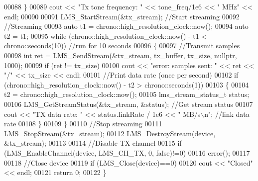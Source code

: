 \begin{DoxyCode}
00088     \}
00089     cout << \textcolor{stringliteral}{"Tx tone frequency: "} << tone\_freq/1e6 << \textcolor{stringliteral}{" MHz"} << endl;
00090 
00091     LMS_StartStream(&tx\_stream);         \textcolor{comment}{//Start streaming}
00092     \textcolor{comment}{//Streaming}
00093     \textcolor{keyword}{auto} t1 = chrono::high\_resolution\_clock::now();
00094     \textcolor{keyword}{auto} t2 = t1;
00095     \textcolor{keywordflow}{while} (chrono::high\_resolution\_clock::now() - t1 < chrono::seconds(10)) \textcolor{comment}{//run for 10 seconds}
00096     \{
00097         \textcolor{comment}{//Transmit samples}
00098         \textcolor{keywordtype}{int} ret = LMS_SendStream(&tx\_stream, tx\_buffer, tx\_size, \textcolor{keyword}{nullptr}, 1000);
00099         \textcolor{keywordflow}{if} (ret != tx\_size)
00100             cout << \textcolor{stringliteral}{"error: samples sent: "} << ret << \textcolor{stringliteral}{"/"} << tx\_size << endl;
00101         \textcolor{comment}{//Print data rate (once per second)}
00102         \textcolor{keywordflow}{if} (chrono::high\_resolution\_clock::now() - t2 > chrono::seconds(1))
00103         \{
00104             t2 = chrono::high\_resolution\_clock::now();
00105             lms_stream_status_t status;
00106             LMS_GetStreamStatus(&tx\_stream, &status);  \textcolor{comment}{//Get stream status}
00107             cout << \textcolor{stringliteral}{"TX data rate: "} << status.linkRate / 1e6 << \textcolor{stringliteral}{" MB/s\(\backslash\)n"}; \textcolor{comment}{//link data rate}
00108         \}
00109     \}
00110     \textcolor{comment}{//Stop streaming}
00111     LMS_StopStream(&tx\_stream);
00112     LMS_DestroyStream(device, &tx\_stream);
00113 
00114     \textcolor{comment}{//Disable TX channel}
00115     \textcolor{keywordflow}{if} (LMS_EnableChannel(device, LMS_CH_TX, 0, \textcolor{keyword}{false})!=0)
00116         error();
00117 
00118     \textcolor{comment}{//Close device}
00119     \textcolor{keywordflow}{if} (LMS_Close(device)==0)
00120         cout << \textcolor{stringliteral}{"Closed"} << endl;
00121     \textcolor{keywordflow}{return} 0;
00122 \}
\end{DoxyCode}
